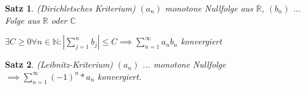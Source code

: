 \documentclass[twocolumn]{article}
\newtheorem{theorem}{Satz}[section]
\begin{document}
\begin{theorem}(Dirichletsches Kriterium)
	$(a_n)$ monotone Nullfolge aus $\mathbb{R}$, $(b_n)$ ... Folge aus $\mathbb{R}$ oder $\mathbb{C}$
	
	$\exists C \geq 0 \forall n \in \mathbb{N}: |\sum_{j=1}^{n}b_j|\leq C \implies \sum_{n=1}^{\infty}a_nb_n$ konvergiert
\end{theorem}

\begin{theorem}(Leibnitz-Kriterium)
	$(a_n)$ ... monotone Nullfolge $\implies \sum_{n=1}^{\infty}(-1)^n*a_n$ konvergiert.
\end{theorem}
\end{document}
